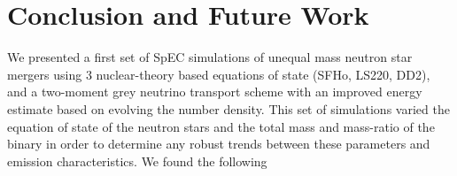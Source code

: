 




\section{Conclusion and Future Work}

We presented a first set of SpEC simulations of unequal mass neutron star mergers using 3 nuclear-theory based equations of state (SFHo, LS220, DD2), and a two-moment grey neutrino transport scheme with an improved energy estimate based on evolving the number density. This set of simulations varied the equation of state of the neutron stars and the total mass and mass-ratio of the binary in order to determine any robust trends between these parameters and emission characteristics. We found the following

